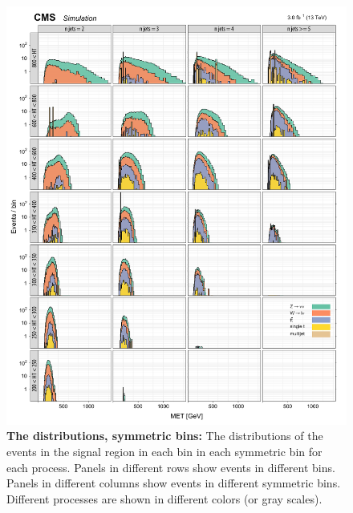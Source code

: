 \begin{figure}[!h]
\centering
\includegraphics[scale=0.95]{figures/kiplots/c150107_s150318_f015_MET_100}
\caption{\textbf{\boldmath The \met distributions, symmetric \njet
bins:} The \met distributions of the events in the signal region in each
\scalht bin in each symmetric \njet bin for each process. Panels in
different rows show events in different \scalht bins. Panels in
different columns show events in different symmetric \njet bins.
Different processes are shown in different colors (or gray scales).}
\label{c150107_s150318_f015_MET_100}
\end{figure}

